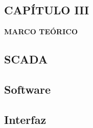 \begin{center}
    \setcounter{section}{3}
    \section*{CAPÍTULO III}
    \vspace*{0.5in}
    \textbf{MARCO TEÓRICO}
\end{center}

\subsection{SCADA}

\subsection{Software}
\subsection{Interfaz}
\subsection{}
\newpage